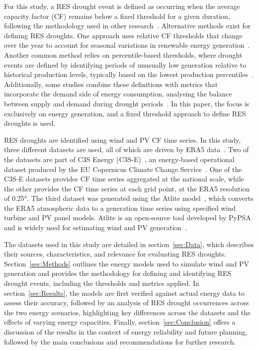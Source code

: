 \documentclass[a4paper, 11pt]{article}
\begin{document}
For this study, a RES drought event is defined as occurring when the average capacity factor (CF) remains below a fixed threshold for a given duration, following the methodology used in other research~\cite{kaspar2019drought, ohba2022drought, mockert2023drought, mayer2023drought}. Alternative methods exist for defining RES droughts. One approach uses relative CF thresholds that change over the year to account for seasonal variations in renewable energy generation~\cite{raynaud2018drought, rinaldi2021drought, gangopadhyay2022drought, allen2023drought, kapica2024drought}. Another common method relies on percentile-based thresholds, where drought events are defined by identifying periods of unusually low generation relative to historical production levels, typically based on the lowest production percentiles~\cite{bracken2024drought, allen2023drought}. Additionally, some studies combine these definitions with metrics that incorporate the demand side of energy consumption, analysing the balance between supply and demand during drought periods~\cite{raynaud2018drought, rinaldi2021drought, allen2023drought, bracken2024drought}. In this paper, the focus is exclusively on energy generation, and a fixed threshold approach to define RES droughts is used. 

RES droughts are identified using wind and PV CF time series. In this study, three different datasets are used, all of which are driven by ERA5 data~\cite{hersbach2020era5}. Two of the datasets are part of C3S Energy (C3S-E)~\cite{cds2023energy}, an energy-based operational dataset produced by the EU Copernicus Climate Change Service~\cite{dubus2023energy}. One of the C3S-E datasets provides CF time series aggregated at the national scale, while the other provides the CF time series at each grid point, at the ERA5 resolution of 0.25°. The third dataset was generated using the Atlite model~\cite{hofman2021atlite}, which converts the  ERA5 atmospheric data to a generation time series using specified wind turbine and PV panel models. Atlite is an open-source tool developed by PyPSA~\cite{hofman2021atlite} and is widely used for estimating wind and PV generation~\cite{mockert2023drought, li2023atlite, parzen2023atlite, ali2023comparative}.



The datasets used in this study are detailed in section~\ref{sec:Data}, which describes their sources, characteristics, and relevance for evaluating RES droughts. Section~\ref{sec:Methods} outlines the energy models used to simulate wind and PV generation and provides the methodology for defining and identifying RES drought events, including the thresholds and metrics applied. In section~\ref{sec:Results}, the models are first verified against actual energy data to assess their accuracy, followed by an analysis of RES drought occurrences across the two energy scenarios, highlighting key differences across the datasets and the effects of varying energy capacities. Finally, section~\ref{sec:Conclusion} offers a discussion of the results in the context of energy reliability and future planning, followed by the main conclusions and recommendations for further research.
\end{document}
